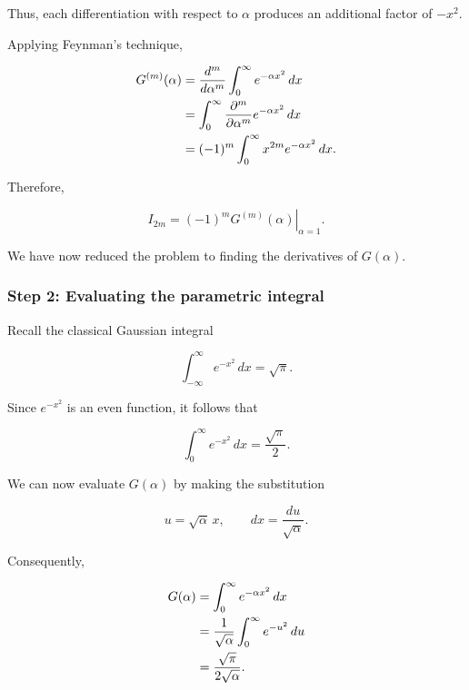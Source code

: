 \documentclass[11pt,a4paper]{article}
\theoremstyle{definition}
\theoremstyle{remark}
\begin{document}
Thus, each differentiation with
respect to $\alpha$ produces an
additional factor of $-x^2$.

Applying Feynman's technique,

\begin{align}
    G^{(m)}(\alpha)
    &=
    \frac{d^m}{d\alpha^m}
    \int_0^\infty e^{-\alpha x^2}\,dx
    \notag\\
    &=
    \int_0^\infty
    \frac{\partial^m}{\partial\alpha^m}
    e^{-\alpha x^2}\,dx
    \notag\\
    &=
    (-1)^m
    \int_0^\infty
    x^{2m}e^{-\alpha x^2}\,dx.
\end{align}

Therefore,

\begin{equation}
    I_{2m}
    =
    (-1)^m
    \left.
    G^{(m)}(\alpha)
    \right|_{\alpha=1}.
    \label{eq:gaussian_even_recovery}
\end{equation}

We have now reduced the problem
to finding the derivatives of
$G(\alpha)$.

\subsubsection*{Step 2: Evaluating the parametric integral}

Recall the classical Gaussian
integral

\begin{equation}
    \int_{-\infty}^{\infty}
    e^{-x^2}\,dx
    =
    \sqrt{\pi}.
    \label{eq:standard_gaussian}
\end{equation}

Since $e^{-x^2}$ is an even
function, it follows that

\begin{equation}
    \int_0^\infty e^{-x^2}\,dx
    =
    \frac{\sqrt{\pi}}{2}.
    \label{eq:half_gaussian}
\end{equation}

We can now evaluate
$G(\alpha)$ by making the
substitution

\[
    u=\sqrt{\alpha}\,x,
    \qquad
    dx=\frac{du}{\sqrt{\alpha}}.
\]

Consequently,

\begin{align}
    G(\alpha)
    &=
    \int_0^\infty
    e^{-\alpha x^2}\,dx
    \notag\\
    &=
    \frac{1}{\sqrt{\alpha}}
    \int_0^\infty e^{-u^2}\,du
    \notag\\
    &=
    \frac{\sqrt{\pi}}{2\sqrt{\alpha}}.
\end{align}
\end{document}
